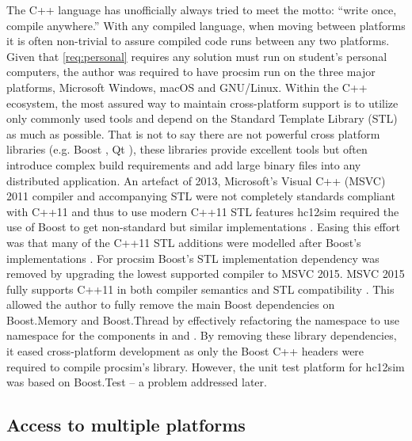 The C++ language has unofficially always tried to meet the motto: ``write once, compile anywhere.'' With any compiled language, when moving between platforms it is often non-trivial to assure compiled code runs between any two platforms. Given that \cref{req:personal} requires any solution must run on student's personal computers, the author was required to have procsim run on the three major platforms, Microsoft Windows, macOS and GNU/Linux. Within the C++ ecosystem, the most assured way to maintain cross-platform support is to utilize only commonly used tools and depend on the Standard Template Library (STL) as much as possible. That is not to say there are not powerful cross platform libraries (e.g. Boost \cite{Boost}, Qt \cite{Qt}), these libraries provide excellent tools but often introduce complex build requirements and add large binary files into any distributed application. An artefact of 2013, Microsoft's Visual C++ (MSVC) 2011 compiler and accompanying STL were not completely standards compliant with C++11 and thus to use modern C++11 STL features hc12sim required the use of Boost to get non-standard but similar implementations \cite{Microsoft:MSVC:ModernCPP:2011}. Easing this effort was that many of the C++11 STL additions were modelled after Boost's implementations \cite{Meyers2005}. For procsim Boost's STL implementation dependency was removed by upgrading the lowest supported compiler to MSVC 2015. MSVC 2015 fully supports C++11 in both compiler semantics and STL compatibility \cite{Microsoft:MSVC:ModernCPP}. This allowed the author to fully remove the main Boost dependencies on Boost.Memory and Boost.Thread by effectively refactoring the  namespace to use  namespace for the components in  and . By removing these library dependencies, it eased cross-platform development as only the Boost C++ headers were required to compile procsim's library. However, the unit test platform for hc12sim was based on Boost.Test \cite{Boost1.53.0:Test} -- a problem addressed later.

\subsection{Access to multiple platforms}

